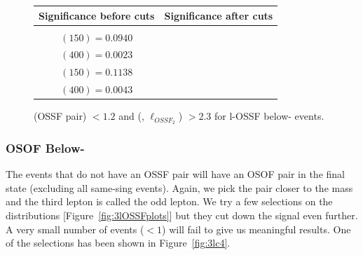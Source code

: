 \documentclass[letterpaper,12pt]{article}
\begin{document}
\begin{figure}[h!]
{  }
  \makebox[\textwidth][c]{%
    \rule{0pt}{0.6cm}
    }
  \tiny
  \setlength{\tabcolsep}{20pt}
  \renewcommand{\arraystretch}{1.6}
  \begin{tabular}{|c|c|}
    \hline
    Significance before cuts & Significance after cuts\\
    \hline
    \Gape[0.2cm]{\makecell{
        \sig{} $(100) = 0.1192$\\
        \sig{} $(150) = 0.0940$\\
        \sig{} $(400) = 0.0023$ }} & 
    \makecell{
      \sig{} $(100) = 0.1794$\\
      \sig{} $(150) = 0.1138$\\
      \sig{} $(400) = 0.0043$}\\
    \hline
  \end{tabular}
  \caption[\3l-OSSF Cut-3: \DeltaR{} (OSSF pair) $<1.2$ and \dphi{} (\lodd, $\ell_{OSSF_{2}}$) $>2.3$]{\DeltaR{} (OSSF pair) $<1.2$ and \dphi{} (\lodd, $\ell_{OSSF_{2}}$) $>2.3$ for \3l-OSSF below-\Zboson{} events.}
  \label{fig:3lc2}
\end{figure}

\subsubsection{OSOF Below-{\boldmath \Zboson}}
\label{sec:osof}

The events that do not have an OSSF pair will have an OSOF pair in the final state (excluding all same-sing events). Again, we pick the pair closer to the \Zboson{} mass and the third lepton is called the odd lepton. We try a few selections on the distributions [Figure~\ref{fig:3lOSSFplots}] but they cut down the signal even further. A very small number of events ($<1$) will fail to give us meaningful results. One of the selections has been shown in Figure~\ref{fig:3lc4}. 
\end{document}
